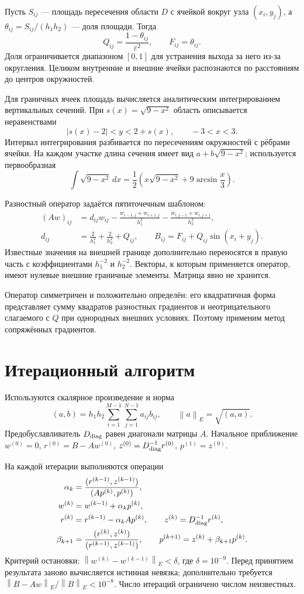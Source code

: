 \documentclass[12pt,a4paper]{article}
\newcommand{\norm}[1]{\left\lVert #1\right\rVert}
\begin{document}
Пусть $S_{ij}$ --- площадь пересечения области $D$ с ячейкой вокруг узла $(x_i,y_j)$, а
$\theta_{ij}=S_{ij}/(h_1h_2)$ --- доля площади. Тогда
\[
Q_{ij}=\frac{1-\theta_{ij}}{\varepsilon^2},
\qquad F_{ij}=\theta_{ij}.
\]
Доля ограничивается диапазоном $[0,1]$ для устранения выхода за него из-за округления. Целиком внутренние и внешние ячейки распознаются по расстояниям до центров окружностей.

Для граничных ячеек площадь вычисляется аналитическим интегрированием вертикальных сечений. При $s(x)=\sqrt{9-x^2}$ область описывается неравенствами
\[
|s(x)-2|<y<2+s(x),\qquad -3<x<3.
\]
Интервал интегрирования разбивается по пересечениям окружностей с рёбрами ячейки. На каждом участке длина сечения имеет вид $a+b\sqrt{9-x^2}$; используется первообразная
\[
\int\sqrt{9-x^2}\,dx
=\frac12\left(x\sqrt{9-x^2}+9\arcsin\frac x3\right).
\]

Разностный оператор задаётся пятиточечным шаблоном:
\begin{align*}
(Aw)_{ij}
&=d_{ij}w_{ij}
-\frac{w_{i-1,j}+w_{i+1,j}}{h_1^2}
-\frac{w_{i,j-1}+w_{i,j+1}}{h_2^2},\\
d_{ij}&=\frac2{h_1^2}+\frac2{h_2^2}+Q_{ij},\qquad
B_{ij}=F_{ij}+Q_{ij}\sin(x_i+y_j).
\end{align*}
Известные значения на внешней границе дополнительно переносятся в правую часть с коэффициентами $h_1^{-2}$ и $h_2^{-2}$. Векторы, к которым применяется оператор, имеют нулевые внешние граничные элементы. Матрица явно не хранится.

Оператор симметричен и положительно определён: его квадратичная форма представляет сумму квадратов разностных градиентов и неотрицательного слагаемого с $Q$ при однородных внешних условиях. Поэтому применим метод сопряжённых градиентов.

\section{Итерационный алгоритм}
Используются скалярное произведение и норма
\[
(a,b)=h_1h_2\sum_{i=1}^{M-1}\sum_{j=1}^{N-1}a_{ij}b_{ij},
\qquad \norm a_E=\sqrt{(a,a)}.
\]
Предобуславливатель $D_{\rm diag}$ равен диагонали матрицы $A$.
Начальное приближение $w^{(0)}=0$,
$r^{(0)}=B-Aw^{(0)}$, $z^{(0)}=D_{\rm diag}^{-1}r^{(0)}$, $p^{(1)}=z^{(0)}$.

На каждой итерации выполняются операции
\begin{align*}
\alpha_k&=\frac{(r^{(k-1)},z^{(k-1)})}{(Ap^{(k)},p^{(k)})},\\
w^{(k)}&=w^{(k-1)}+\alpha_kp^{(k)},\\
r^{(k)}&=r^{(k-1)}-\alpha_kAp^{(k)},\qquad
z^{(k)}=D_{\rm diag}^{-1}r^{(k)},\\
\beta_{k+1}&=\frac{(r^{(k)},z^{(k)})}{(r^{(k-1)},z^{(k-1)})},\qquad
p^{(k+1)}=z^{(k)}+\beta_{k+1}p^{(k)}.
\end{align*}
Критерий остановки:
$\norm{w^{(k)}-w^{(k-1)}}_E<\delta$, где $\delta=10^{-9}$.
Перед принятием результата заново вычисляется истинная невязка; дополнительно требуется
$\norm{B-Aw}_E/\norm B_E<10^{-8}$. Число итераций ограничено числом неизвестных.
\end{document}
